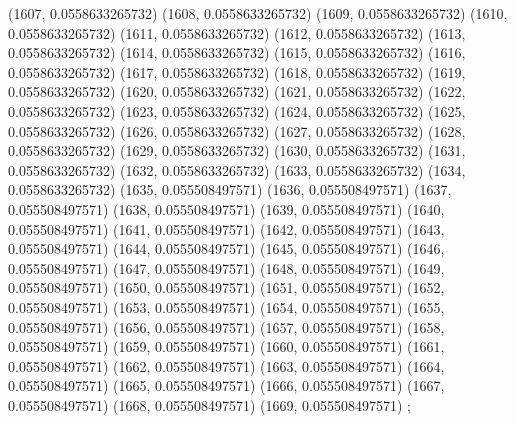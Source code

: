 {					(1607, 0.0558633265732)
					(1608, 0.0558633265732)
					(1609, 0.0558633265732)
					(1610, 0.0558633265732)
					(1611, 0.0558633265732)
					(1612, 0.0558633265732)
					(1613, 0.0558633265732)
					(1614, 0.0558633265732)
					(1615, 0.0558633265732)
					(1616, 0.0558633265732)
					(1617, 0.0558633265732)
					(1618, 0.0558633265732)
					(1619, 0.0558633265732)
					(1620, 0.0558633265732)
					(1621, 0.0558633265732)
					(1622, 0.0558633265732)
					(1623, 0.0558633265732)
					(1624, 0.0558633265732)
					(1625, 0.0558633265732)
					(1626, 0.0558633265732)
					(1627, 0.0558633265732)
					(1628, 0.0558633265732)
					(1629, 0.0558633265732)
					(1630, 0.0558633265732)
					(1631, 0.0558633265732)
					(1632, 0.0558633265732)
					(1633, 0.0558633265732)
					(1634, 0.0558633265732)
					(1635, 0.055508497571)
					(1636, 0.055508497571)
					(1637, 0.055508497571)
					(1638, 0.055508497571)
					(1639, 0.055508497571)
					(1640, 0.055508497571)
					(1641, 0.055508497571)
					(1642, 0.055508497571)
					(1643, 0.055508497571)
					(1644, 0.055508497571)
					(1645, 0.055508497571)
					(1646, 0.055508497571)
					(1647, 0.055508497571)
					(1648, 0.055508497571)
					(1649, 0.055508497571)
					(1650, 0.055508497571)
					(1651, 0.055508497571)
					(1652, 0.055508497571)
					(1653, 0.055508497571)
					(1654, 0.055508497571)
					(1655, 0.055508497571)
					(1656, 0.055508497571)
					(1657, 0.055508497571)
					(1658, 0.055508497571)
					(1659, 0.055508497571)
					(1660, 0.055508497571)
					(1661, 0.055508497571)
					(1662, 0.055508497571)
					(1663, 0.055508497571)
					(1664, 0.055508497571)
					(1665, 0.055508497571)
					(1666, 0.055508497571)
					(1667, 0.055508497571)
					(1668, 0.055508497571)
					(1669, 0.055508497571)
				};
